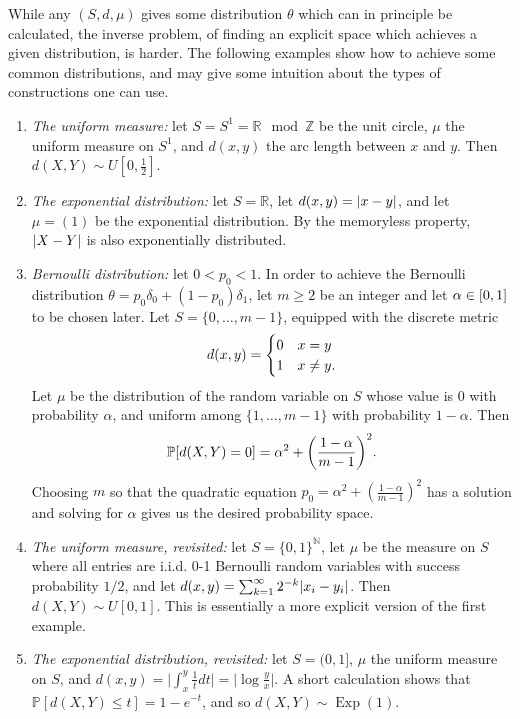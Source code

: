 \documentclass[10pt]{amsart}
\theoremstyle{definition}\newtheorem{defi}[theo]{Definition}\newtheorem{rema}[theo]{Remark}\newtheorem{exam}[theo]{Example}\newtheorem{exem}[theo]{Example}\newtheorem{nota}[theo]{Notation}
\DeclareMathOperator{\Exp}{Exp}
\renewcommand*\r{\mathbb{R}}
\newcommand*\n{\mathbb{N}}
\newcommand*\z{\mathbb{Z}}
\newcommand*\p{\mathbb{P}}
\newcommand*\abs[1]{\left|#1\right|}
\let\originalleft\left
\let\originalright\right
\renewcommand{\left}{\mathopen{}\mathclose\bgroup\originalleft}
\renewcommand{\right}{\aftergroup\egroup\originalright}
\let\oldin\in
\renewcommand{\in}{\mathchoice{\oldin}{\oldin}{\,\oldin\,}{\,\oldin\,}}
\begin{document}
While any $(S,d,\mu)$ gives some distribution $\theta$ which can in principle be calculated, the inverse problem, of finding an explicit space which achieves a given distribution, is harder. The following examples show how to achieve some common distributions, and may give some intuition about the types of constructions one can use.
\begin{enumerate}%
\item \emph{The uniform measure:} let $S=S^{1}=\r\mod\z$ be the unit circle, $\mu$ the uniform measure on $S^{1}$, and $d(x,y)$ the arc length between $x$ and $y$. Then $d(X,Y)\sim U[0,\frac{1}{2}]$.
\item \emph{The exponential distribution:} let $S=\r$, let $d(x,y)=\abs{x-y}$, and let $\mu=
(1)$ be the exponential distribution. By the memoryless property, $\abs{X-Y}$ is also exponentially distributed.
\item \emph{Bernoulli distribution:}\label{enu:bernoulli_construction} let $0< p_{0} < 1$. In order to achieve the Bernoulli distribution $\theta=p_{0}\delta_{0}+(1-p_{0})\delta_{1}$, let $m\geq2$ be an integer and let $\alpha\in[0,1]$ to be chosen later. Let $S=\{ 0,\ldots,m-1\} $, equipped with the discrete metric
\[
d\left(x,y\right)=
\begin{cases}
0 & x=y\\
1 & x\neq y.
\end{cases}
\]
Let $\mu$ be the distribution of the random variable on $S$ whose value is $0$ with probability $\alpha$, and uniform among $\{ 1,\ldots,m-1\} $ with probability $1-\alpha$. Then
\begin{equation}\label{eq:bernoulli_probability}
\p\left[d\left(X,Y\right)=0\right]=\alpha^{2}+\left(\frac{1-\alpha}{m-1}\right)^{2}.
\end{equation}
Choosing $m$ so that the quadratic equation $p_{0}=\alpha^{2}+(\frac{1-\alpha}{m-1})^{2}$ has a solution and solving for $\alpha$ gives us the desired probability space.
\item \emph{The uniform measure, revisited:} let $S=\{ 0,1\} ^{\n}$, let $\mu$ be the measure on $S$ where all entries are i.i.d. $0$-1 Bernoulli random variables with success probability $1/2$, and let $d(x,y)=\sum_{k=1}^{\infty}2^{-k}\abs{x_{i}-y_{i}}$. Then $d(X,Y)\sim U[0,1]$. This is essentially a more explicit version of the first example.
\item \emph{The exponential distribution, revisited:} let $S=(0,1]$, $\mu$ the uniform measure on $S$, and $d(x,y)=\lvert\int_{x}^{y}\frac{1}{t}d t\rvert=\lvert\log\frac{y}{x}\rvert$. A short calculation shows that $\p[d(X,Y)\leq t]=1-e^{-t}$, and so $d(X,Y)\sim\Exp(1)$.

\end{enumerate}
\end{document}
